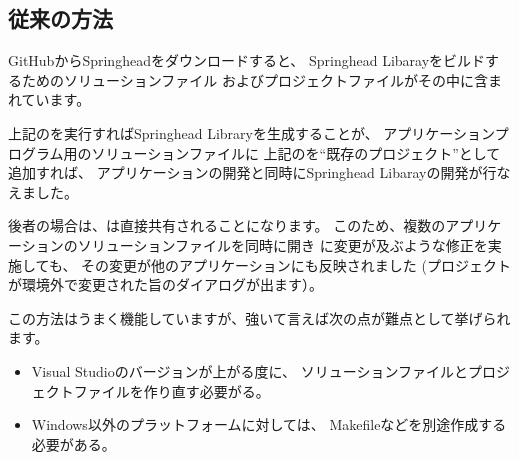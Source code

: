 
\subsection{従来の方法}
\label{subsec:ConventionalMethod}

\noindent
GitHubからSpringheadをダウンロードすると、
Springhead Libarayをビルドするためのソリューションファイル
およびプロジェクトファイルがその中に含まれています。

\medskip
\begin{narrow}
    \begin{narrow}\begin{minipage}{\textwidth}
	\medskip
  \end{minipage}\end{narrow}
\end{narrow}

上記の\SolutionFile を実行すればSpringhead Libraryを生成することが、
アプリケーションプログラム用のソリューションファイルに
上記の\ProjectFile を``既存のプロジェクト''として追加すれば、
アプリケーションの開発と同時にSpringhead Libarayの開発が行なえました。

後者の場合は、\ProjectFile は直接共有されることになります。
このため、複数のアプリケーションのソリューションファイルを同時に開き
\ProjectFile に変更が及ぶような修正を実施しても、
その変更が他のアプリケーションにも反映されました
(プロジェクトが環境外で変更された旨のダイアログが出ます）。

\medskip
この方法はうまく機能していますが、強いて言えば次の点が難点として挙げられます。
\begin{itemize}
  \item	Visual Studioのバージョンが上がる度に、
	ソリューションファイルとプロジェクトファイルを作り直す必要がる。
  \item	Windows以外のプラットフォームに対しては、
	Makefileなどを別途作成する必要がある。
\end{itemize}

